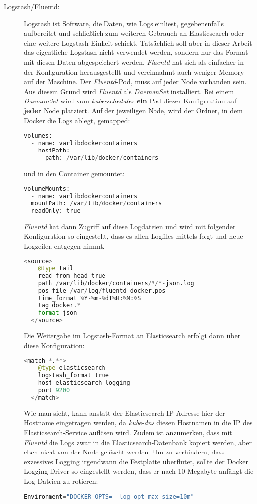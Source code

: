 \begin{description}
  \item[Logstash/Fluentd:]
  Logstash ist Software, die Daten, wie Logs einliest, gegebenenfalls aufbereitet und
  schließlich zum weiteren Gebrauch an Elasticsearch oder eine weitere Logstash
  Einheit schickt.
  Tatsächlich soll aber in dieser Arbeit das eigentliche Logstash nicht
  verwendet werden,
  sondern nur das Format mit diesen Daten abgespeichert werden.
  \emph{Fluentd} \cite{fluentd} hat sich als einfacher in der Konfiguration herausgestellt und
  vereinnahmt auch weniger Memory auf der Maschine.
  Der \emph{Fluentd}-Pod, muss auf jeder Node vorhanden sein. Aus diesem Grund wird
  \emph{Fluentd}
  als \emph{DaemonSet} installiert. Bei einem \emph{DaemonSet} wird vom \emph{kube-scheduler}
  \textbf{ein} Pod dieser Konfiguration auf \textbf{jeder} Node platziert.
  Auf der jeweiligen
  Node, wird
  der Ordner, in dem Docker die Logs ablegt, gemapped:
  \begin{lstlisting}[language=Python,numbers=none]
  volumes:
  - name: varlibdockercontainers
    hostPath:
      path: /var/lib/docker/containers  \end{lstlisting}
  und in den Container gemountet:
  \begin{lstlisting}[language=Python,numbers=none]
  volumeMounts:
  - name: varlibdockercontainers
  mountPath: /var/lib/docker/containers
  readOnly: true  \end{lstlisting}
  \emph{Fluentd} hat dann Zugriff auf diese Logdateien und wird
  mit folgender Konfiguration so eingestellt, dass es allen Logfiles
  mittels  folgt und neue Logzeilen entgegen nimmt.
  \begin{lstlisting}[language=Python,numbers=none]
  <source>
    @type tail
    read_from_head true
    path /var/lib/docker/containers/*/*-json.log
    pos_file /var/log/fluentd-docker.pos
    time_format %Y-%m-%dT%H:%M:%S
    tag docker.*
    format json
  </source>  \end{lstlisting}

  Die Weitergabe im Logstash-Format an Elasticsearch erfolgt dann über
  diese Konfiguration:
  \begin{lstlisting}[language=Python,numbers=none]
  <match *.**>
    @type elasticsearch
    logstash_format true
    host elasticsearch-logging
    port 9200
  </match>  \end{lstlisting}
  Wie man sieht, kann anstatt der Elasticsearch IP-Adresse hier der
  Hostname eingetragen werden, da \emph{kube-dns} diesen Hostnamen in die IP des
  Elasticsearch-Service
  auflösen wird.
  Zudem ist anzumerken, dass mit \emph{Fluentd} die Logs zwar in die
  Elasticsearch-Datenbank kopiert werden,
  aber eben nicht von der Node gelöscht werden. Um zu verhindern,
  dass exzessives Logging irgendwann
  die Festplatte überflutet, sollte der Docker Logging-Driver so eingestellt
  werden, dass er nach 10 Megabyte anfängt
  die Log-Dateien zu rotieren:
  \begin{lstlisting}[language=Python,numbers=none,breaklines=true]
  Environment="DOCKER_OPTS=--log-opt max-size=10m"\end{lstlisting}


\end{description}
